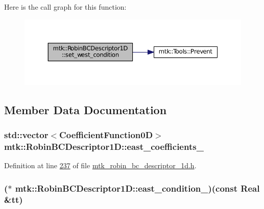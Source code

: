 Here is the call graph for this function\+:
\nopagebreak
\begin{figure}[H]
\begin{center}
\leavevmode
\includegraphics[width=350pt]{classmtk_1_1RobinBCDescriptor1D_a06bfaf0126d528247c3c76fdd19f4b85_cgraph}
\end{center}
\end{figure}




\subsection{Member Data Documentation}
\hypertarget{classmtk_1_1RobinBCDescriptor1D_aa8f5350e1767174f92fda449b44d1b04}{
\subsubsection[{east\+\_\+coefficients\+\_\+}]{\setlength{\rightskip}{0pt plus 5cm}std\+::vector$<${\bf Coefficient\+Function0\+D}$>$ mtk\+::\+Robin\+B\+C\+Descriptor1\+D\+::east\+\_\+coefficients\+\_\+\hspace{0.3cm}{\ttfamily [private]}}}\label{classmtk_1_1RobinBCDescriptor1D_aa8f5350e1767174f92fda449b44d1b04}


Definition at line \hyperlink{mtk__robin__bc__descriptor__1d_8h_source_l00237}{237} of file \hyperlink{mtk__robin__bc__descriptor__1d_8h_source}{mtk\+\_\+robin\+\_\+bc\+\_\+descriptor\+\_\+1d.\+h}.

\hypertarget{classmtk_1_1RobinBCDescriptor1D_adecf9da4390869d2aa49ccb1307320d6}{
\subsubsection[{east\+\_\+condition\+\_\+}]{($\ast$ mtk\+::\+Robin\+B\+C\+Descriptor1\+D\+::east\+\_\+condition\+\_\+)(const {\bf Real} \&tt)\hspace{0.3cm}{\ttfamily [private]}}}\label{classmtk_1_1RobinBCDescriptor1D_adecf9da4390869d2aa49ccb1307320d6}


